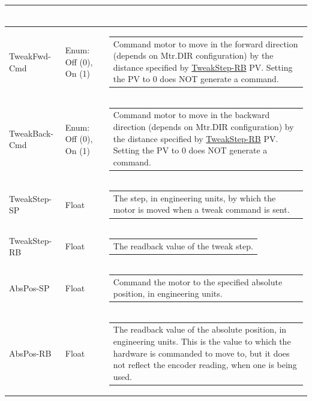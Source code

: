 \documentclass[openany]{article}
\begin{document}
\begin{longtable}{| m{4.5cm} m{2.5cm}  m{8.5cm} |}
\begin{tabular}{@{}m{6cm}@{}}
            \end{tabular} \hypertarget{pv:tweak-fwd-cmd}{}\\ \hline
        TweakFwd-Cmd & Enum: Off (0), On (1) & \begin{tabular}{@{}m{6cm}@{}}
                Command motor to move in the forward direction (depends on Mtr.DIR configuration) by the distance specified by \hyperlink{pv:tweak-step}{TweakStep-RB} PV. Setting the PV to 0 does NOT generate a command.
            \end{tabular} \hypertarget{pv:tweak-back-cmd}{}\\ \hline
        TweakBack-Cmd & Enum: Off (0), On (1) & \begin{tabular}{@{}m{6cm}@{}}
                Command motor to move in the backward direction (depends on Mtr.DIR configuration) by the distance specified by \hyperlink{pv:tweak-step}{TweakStep-RB} PV. Setting the PV to 0 does NOT generate a command.
            \end{tabular} \hypertarget{pv:tweak-step}{}\\ \hline
        TweakStep-SP & Float & \begin{tabular}{@{}m{6cm}@{}}
                The step, in engineering units, by which the motor is moved when a tweak command is sent.
            \end{tabular} \hypertarget{}{}\\ \hline
        TweakStep-RB & Float & \begin{tabular}{@{}m{6cm}@{}}
                The readback value of the tweak step.
            \end{tabular} \hypertarget{pv:abs-pos}{}\\ \hline
        AbsPos-SP & Float & \begin{tabular}{@{}m{6cm}@{}}
                Command the motor to the specified absolute position, in engineering units.
            \end{tabular} \hypertarget{}{}\\ \hline
        AbsPos-RB & Float & \begin{tabular}{@{}m{6cm}@{}}
                The readback value of the absolute position, in engineering units. This is the value to which the hardware is commanded to move to, but it does not reflect the encoder reading, when one is being used.
            \end{tabular} \hypertarget{pv:mtr-on-macro-cte}{}\\ \hline

\end{longtable}
\end{document}
